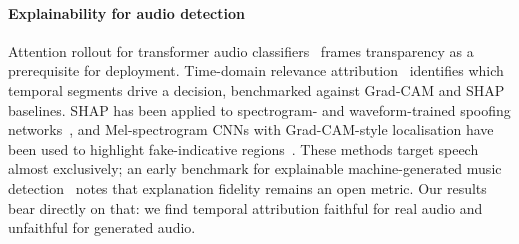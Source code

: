 \paragraph{Explainability for audio detection}
Attention rollout for transformer audio classifiers~\cite{channing2025} frames
transparency as a prerequisite for deployment. Time-domain relevance
attribution~\cite{grinberg2025} identifies which temporal segments drive a
decision, benchmarked against Grad-CAM and SHAP baselines. SHAP has been applied
to spectrogram- and waveform-trained spoofing networks~\cite{yu2024}, and
Mel-spectrogram CNNs with Grad-CAM-style localisation have been used to
highlight fake-indicative regions~\cite{bajwa2025}. These methods target speech
almost exclusively; an early benchmark for explainable machine-generated music
detection~\cite{li2025explainable} notes that explanation fidelity remains an
open metric. Our results bear directly on that: we find temporal attribution
faithful for real audio and unfaithful for generated audio.
